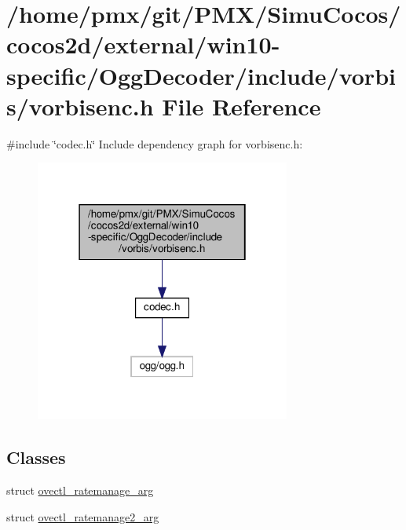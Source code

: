 \hypertarget{cocos2d_2external_2win10-specific_2OggDecoder_2include_2vorbis_2vorbisenc_8h}{}\section{/home/pmx/git/\+P\+M\+X/\+Simu\+Cocos/cocos2d/external/win10-\/specific/\+Ogg\+Decoder/include/vorbis/vorbisenc.h File Reference}
\label{cocos2d_2external_2win10-specific_2OggDecoder_2include_2vorbis_2vorbisenc_8h}
{\ttfamily \#include \char`\"{}codec.\+h\char`\"{}}\newline
Include dependency graph for vorbisenc.\+h\+:
\nopagebreak
\begin{figure}[H]
\begin{center}
\leavevmode
\includegraphics[width=238pt]{cocos2d_2external_2win10-specific_2OggDecoder_2include_2vorbis_2vorbisenc_8h__incl}
\end{center}
\end{figure}
\subsection*{Classes}
\begin{DoxyCompactItemize}
\item 
struct \hyperlink{structovectl__ratemanage__arg}{ovectl\+\_\+ratemanage\+\_\+arg}
\item 
struct \hyperlink{structovectl__ratemanage2__arg}{ovectl\+\_\+ratemanage2\+\_\+arg}
\end{DoxyCompactItemize}
